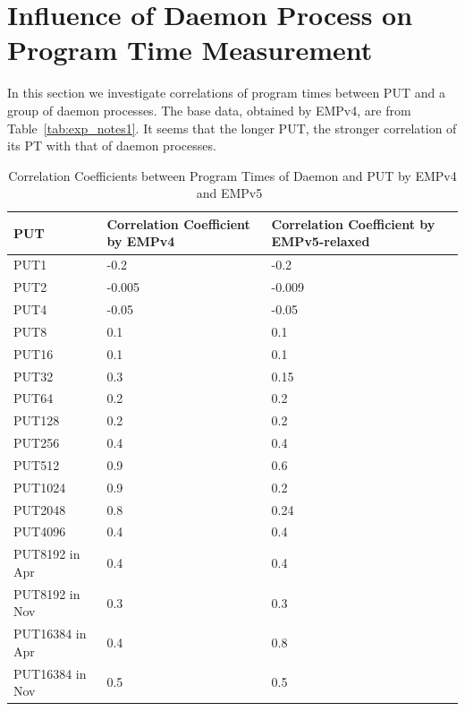 \documentclass[10pt]{article}
\begin{document}
\clearpage
\newpage

\section{Influence of Daemon Process on Program Time Measurement~\label{sec:daemon_put}}
In this section we investigate correlations of program times between 
PUT and a group of daemon processes.
The base data, obtained by EMPv4, are from Table~\ref{tab:exp_notes1}. 
It seems that the longer PUT, the stronger correlation of its PT with that of daemon processes.

\begin{table}[h]
\centering
{
 \begin{tabular}{|l|l|l|} \hline
PUT & Correlation Coefficient by EMPv4 & Correlation Coefficient by EMPv5-relaxed\\ \hline
PUT1 & -0.2 & -0.2\\ \hline 
PUT2 & -0.005 & -0.009\\ \hline 
PUT4 & -0.05 & -0.05\\ \hline
PUT8 & 0.1 & 0.1 \\ \hline 
PUT16 & 0.1 & 0.1\\ \hline 
PUT32 & 0.3 & 0.15\\ \hline  
PUT64 & 0.2 & 0.2 \\ \hline 
PUT128 & 0.2 & 0.2 \\ \hline 
PUT256 & 0.4 & 0.4\\ \hline 
PUT512 & 0.9 & 0.6\\ \hline 
PUT1024 & 0.9 & 0.2\\ \hline 
PUT2048 & 0.8 & 0.24\\ \hline 
PUT4096 & 0.4 & 0.4\\ \hline 
PUT8192 in Apr & 0.4 & 0.4 \\ \hline 
PUT8192 in Nov & 0.3 & 0.3 \\ \hline
PUT16384 in Apr & 0.4 & 0.8\\ \hline
PUT16384 in Nov & 0.5 & 0.5\\ \hline
  \end{tabular}
  }
 \caption{Correlation Coefficients between Program Times of Daemon and PUT by EMPv4 and EMPv5~\label{fig:corr_put_daemon}}
\end{table}
\end{document}
